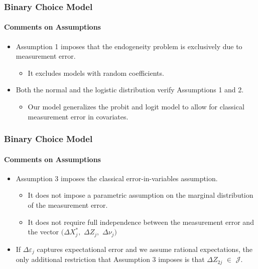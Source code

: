 \documentclass[notes=show]{beamer}
\begin{document}
\begin{frame}
\frametitle{Binary Choice Model}
\framesubtitle{Comments on Assumptions}

\begin{itemize}
	\item Assumption 1 imposes that the endogeneity problem is exclusively due to measurement error.
	\begin{itemize}
		\item It excludes models with random coefficients.
	\end{itemize}
	\item Both the normal and the logistic distribution verify Assumptions 1 and 2. 
	\begin{itemize}
		\item Our model generalizes the probit and logit model to allow for classical measurement error in covariates.
	\end{itemize}
\end{itemize}
\end{frame}

\begin{frame}
\frametitle{Binary Choice Model}
\framesubtitle{Comments on Assumptions}

\begin{itemize}
	\item Assumption 3 imposes the classical error-in-variables assumption.
	\begin{itemize}
		\item It does not impose a parametric assumption on the marginal distribution of the measurement error.
		\item It does not require full independence between the measurement error and the vector $(\Delta X^{*}_{j},$ $\Delta Z_{j},$ $\Delta\nu_{j})$
	\end{itemize}
	\item If $\Delta\varepsilon_{j}$ captures expectational error and we assume rational expectations, the only additional restriction that Assumption 3 imposes is that $\Delta Z_{2j}$ $\in$ $\mathcal{J}$.
\end{itemize}
\end{frame}
\end{document}
